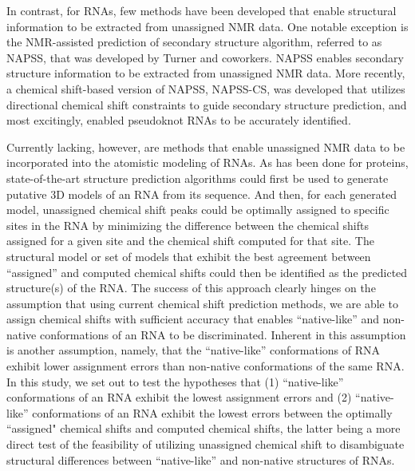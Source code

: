 \documentclass[journal=jcisd8,manuscript=article,layout=onecolumn]{achemso}
\begin{document}
In contrast, for RNAs, few methods have been developed that enable structural information to be extracted from unassigned NMR data. One notable exception is the NMR-assisted prediction of secondary structure algorithm, referred to as NAPSS, that was  developed by Turner and coworkers. NAPSS enables secondary structure information to be extracted from unassigned NMR data\cite{hart2008nmr}. More recently, a chemical shift-based version of NAPSS, NAPSS-CS, was developed that utilizes directional chemical shift constraints to guide secondary structure prediction, and most excitingly, enabled pseudoknot RNAs to be accurately identified\cite{chen2015nuclear}. 

Currently lacking, however, are methods that enable unassigned NMR data to be incorporated into the atomistic modeling of RNAs. As has been done for proteins, state-of-the-art structure prediction algorithms could first be used to generate putative 3D models of an RNA from its sequence. And then, for each generated model, unassigned chemical shift peaks could be optimally assigned to specific sites in the RNA by minimizing the difference between the chemical shifts assigned for a given site and the chemical shift computed for that site. The structural model or set of models that exhibit the best agreement between ``assigned'' and computed chemical shifts could then be identified as the predicted structure(s) of the RNA\cite{meiler2003rapid, bermejo2008deuterated, courtney2015experimental}. The success of this approach clearly hinges on the assumption that using current chemical shift prediction methods, we are able to assign chemical shifts with sufficient accuracy that enables ``native-like'' and non-native conformations of an RNA to be discriminated. Inherent in this assumption is another assumption, namely, that the ``native-like'' conformations of RNA exhibit lower assignment errors than non-native conformations of the same RNA. In this study, we set out to test the hypotheses that (1) ``native-like'' conformations of an RNA exhibit the lowest assignment errors and (2)  ``native-like'' conformations of an RNA exhibit the lowest errors between the optimally ``assigned" chemical shifts and computed chemical shifts, the latter being a more direct test of the feasibility of utilizing unassigned chemical shift to disambiguate structural differences between ``native-like'' and non-native structures of RNAs.
\end{document}
